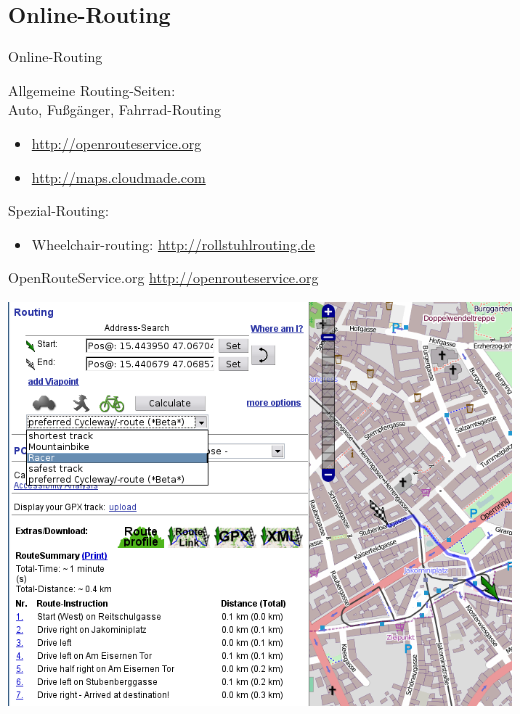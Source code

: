 \documentclass{beamer}
\begin{document}
\subsection{Online-Routing}

\begin{frame}{Online-Routing}

Allgemeine Routing-Seiten:\\
Auto, Fußgänger, Fahrrad-Routing

\begin{itemize}
  \item \url{http://openrouteservice.org}
  \item \url{http://maps.cloudmade.com}
\end{itemize}


Spezial-Routing:

\begin{itemize}
  \item Wheelchair-routing: \url{http://rollstuhlrouting.de}
\end{itemize}

\end{frame}


\begin{frame}{OpenRouteService.org}
\url{http://openrouteservice.org}

\begin{center}
\includegraphics[width=.55\paperwidth]{ors-cycleroute.png}
\end{center}
\end{frame}
\end{document}
